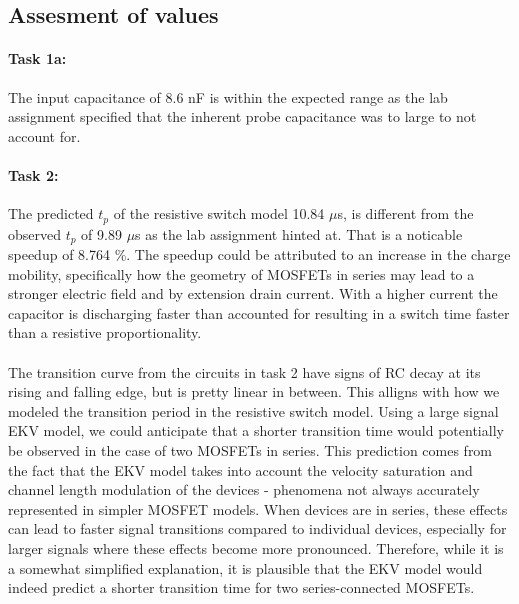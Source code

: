 \documentclass[onecolumn]{article}
\begin{document}
\subsection{Assesment of values}

\paragraph{Task 1a:} The input capacitance of 8.6 nF is within the expected range as the lab assignment specified that the inherent probe capacitance was to large to not account for. 

\paragraph{Task 2:} The predicted $t_p$ of the resistive switch model 10.84 $\mu$s, is different from the observed $t_p$ of 9.89 $\mu$s as the lab assignment hinted at. That is a noticable speedup of 8.764 \%. The speedup could be attributed to an increase in the charge mobility, specifically how the geometry of MOSFETs in series may lead to a stronger electric field and by extension drain current. With a higher current the capacitor is discharging faster than accounted for resulting in a switch time faster than a resistive proportionality.

\paragraph{} The transition curve from the circuits in task 2 have signs of RC decay at its rising and falling edge, but is pretty linear in between. This alligns with how we modeled the transition period in the resistive switch model. Using a large signal EKV model, we could anticipate that a shorter transition time would potentially be observed in the case of two MOSFETs in series. This prediction comes from the fact that the EKV model takes into account the velocity saturation and channel length modulation of the devices - phenomena not always accurately represented in simpler MOSFET models. When devices are in series, these effects can lead to faster signal transitions compared to individual devices, especially for larger signals where these effects become more pronounced. Therefore, while it is a somewhat simplified explanation, it is plausible that the EKV model would indeed predict a shorter transition time for two series-connected MOSFETs.
\end{document}
